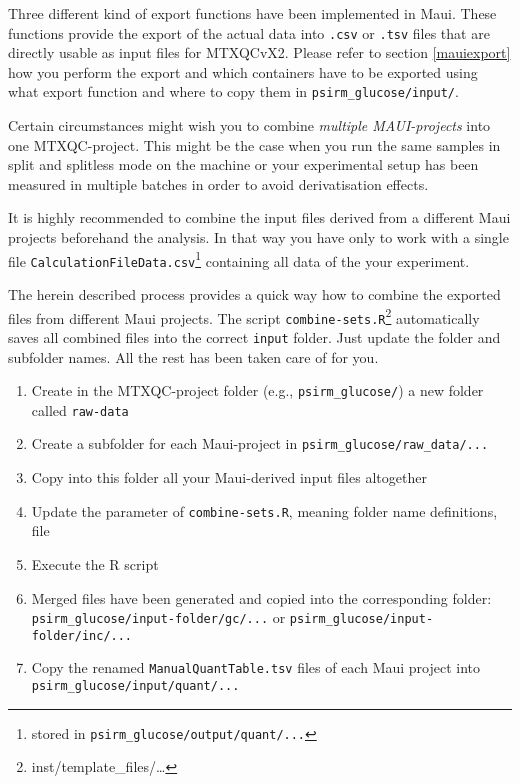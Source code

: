 \documentclass[]{book}
\providecommand{\tightlist}{%
  \setlength{\itemsep}{0pt}\setlength{\parskip}{0pt}}
\let\rmarkdownfootnote\footnote%
\def\footnote{\protect\rmarkdownfootnote}
\theoremstyle{definition}
\theoremstyle{definition}
\theoremstyle{definition}
\theoremstyle{remark}
\begin{document}
Three different kind of export functions have been implemented in Maui.
These functions provide the export of the actual data into \texttt{.csv}
or \texttt{.tsv} files that are directly usable as input files for
MTXQCvX2. Please refer to section \ref{mauiexport} how you perform the
export and which containers have to be exported using what export
function and where to copy them in \texttt{psirm\_glucose/input/}.

Certain circumstances might wish you to combine \emph{multiple
MAUI-projects} into one MTXQC-project. This might be the case when you
run the same samples in split and splitless mode on the machine or your
experimental setup has been measured in multiple batches in order to
avoid derivatisation effects.

It is highly recommended to combine the input files derived from a
different Maui projects beforehand the analysis. In that way you have
only to work with a single file
\texttt{CalculationFileData.csv}\footnote{stored in
  \texttt{psirm\_glucose/output/quant/...}} containing all data of the
your experiment.

The herein described process provides a quick way how to combine the
exported files from different Maui projects. The script
\texttt{combine-sets.R}\footnote{inst/template\_files/\ldots{}}
automatically saves all combined files into the correct \texttt{input}
folder. Just update the folder and subfolder names. All the rest has
been taken care of for you.

\begin{enumerate}
\def\labelenumi{\arabic{enumi}.}
\tightlist
\item
  Create in the MTXQC-project folder (e.g., \texttt{psirm\_glucose/}) a
  new folder called \texttt{raw-data}
\item
  Create a subfolder for each Maui-project in
  \texttt{psirm\_glucose/raw\_data/...}
\item
  Copy into this folder all your Maui-derived input files altogether
\item
  Update the parameter of \texttt{combine-sets.R}, meaning folder name
  definitions, file
\item
  Execute the R script
\item
  Merged files have been generated and copied into the corresponding
  folder: \texttt{psirm\_glucose/input-folder/gc/...} or
  \texttt{psirm\_glucose/input-folder/inc/...}
\item
  Copy the renamed \texttt{ManualQuantTable.tsv} files of each Maui
  project into \texttt{psirm\_glucose/input/quant/...}
\end{enumerate}
\end{document}
